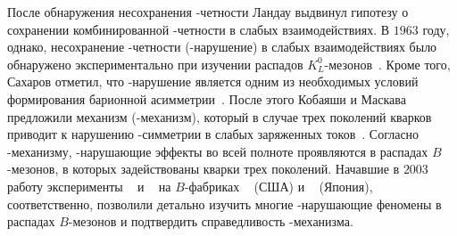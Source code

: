 После обнаружения несохранения \pconj-четности Ландау выдвинул гипотезу о сохранении комбинированной \cpconj-четности в слабых взаимодействиях.  В $1963$ году, однако, несохранение \cpconj-четности (\cpconj-нарушение) в слабых взаимодействиях было обнаружено экспериментально при изучении распадов $K_L^0$-мезонов~\cite{CroninFitch}.  Кроме того, Сахаров отметил, что \cpconj-нарушение является одним из необходимых условий формирования барионной асимметрии~\cite{sakharov}.  
После этого Кобаяши и Маскава предложили механизм (\km-механизм), который в случае трех поколений кварков приводит к нарушению \cpconj-симметрии в слабых заряженных токов~\cite{km}.  Согласно \km-механизму, \cpconj-нарушающие эффекты во всей полноте проявляются в распадах $B$-мезонов, в которых задействованы кварки трех поколений.  Начавшие в $2003$ работу эксперименты \babar~\cite{BaBarNIM} и \belle~\cite{BelleNIM} на $B$-фабриках \pepii~\cite{PEPIICDR} (США) и \kekb~\cite{KEKB1} (Япония), соответственно, позволили детально изучить многие \cpconj-нарушающие феномены в распадах $B$-мезонов и подтвердить справедливость \km-механизма.

